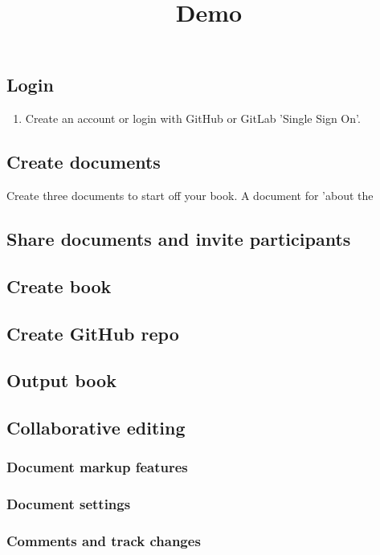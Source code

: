 \documentclass{article}
\begin{document}
\title{Demo}

\maketitle


\subsection{Login}\label{H8043058}


\begin{enumerate}
\item Create an account or login with GitHub or GitLab 'Single Sign On'.


\end{enumerate}

\subsection{Create documents}\label{H2520848}



Create three documents to start off your book. A document for 'about the


\subsection{Share documents and invite participants}\label{H6854650}






\subsection{Create book}\label{H8600370}



\subsection{Create GitHub repo}\label{H8429539}



\subsection{Output book}\label{H3310274}



\subsection{Collaborative editing}\label{H7280177}



\subsubsection{Document markup features}\label{H5057475}



\subsubsection{Document settings}\label{H3272242}



\subsubsection{Comments and track changes}\label{H9963771}
\end{document}
